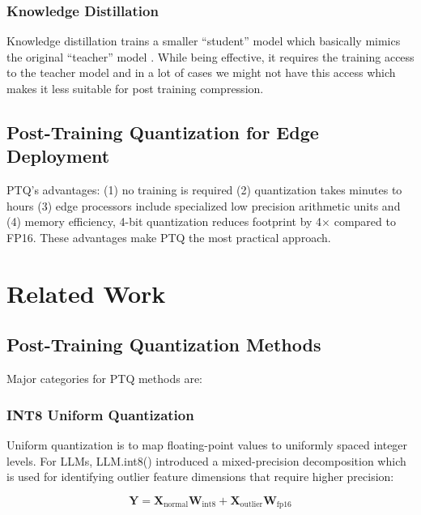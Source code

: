 \documentclass[conference]{IEEEtran}
\begin{document}
\subsubsection{Knowledge Distillation}

Knowledge distillation trains a smaller ``student'' model which basically mimics the original ``teacher'' model \cite{hinton2015distilling}. While being effective, it requires the training access to the teacher model and in a lot of cases we might not have this access which makes it less suitable for post training compression.

\subsection{Post-Training Quantization for Edge Deployment}

PTQ's advantages: (1) no training is required (2) quantization takes minutes to hours (3) edge processors include specialized low precision arithmetic units and (4) memory efficiency, 4-bit quantization reduces footprint by 4$\times$ compared to FP16. These advantages make PTQ the most practical approach.

\section{Related Work}

\subsection{Post-Training Quantization Methods}

Major categories for PTQ methods are:

\subsubsection{INT8 Uniform Quantization}

Uniform quantization is to map floating-point values to uniformly spaced integer levels. For LLMs, LLM.int8() \cite{dettmers2022llm} introduced a mixed-precision decomposition which is used for identifying outlier feature dimensions that require higher precision:

\begin{equation}
\mathbf{Y} = \mathbf{X}_{\text{normal}} \mathbf{W}_{\text{int8}} + \mathbf{X}_{\text{outlier}} \mathbf{W}_{\text{fp16}}
\end{equation}
\end{document}
